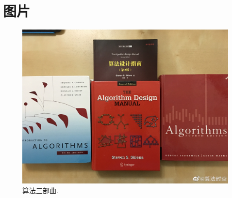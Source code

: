 \chapter{图片}

\begin{figure}[!hbtp]
    \centering
    \includegraphics[width=.8\textwidth]{books.jpg}
    \caption{算法三部曲.}
    \label{fig:books}
\end{figure}
